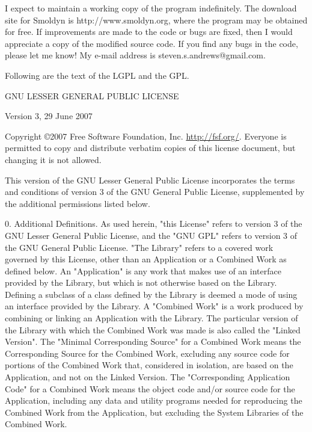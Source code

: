 \documentclass {scrbook}
\begin{document}
I expect to maintain a working copy of the program indefinitely. The download site for Smoldyn is http://www.smoldyn.org, where the program may be obtained for free. If improvements are made to the code or bugs are fixed, then I would appreciate a copy of the modified source code. If you find any bugs in the code, please let me know! My e-mail address is steven.s.andrews@gmail.com.

Following are the text of the LGPL and the GPL.

\begin{tiny}
\begin{center}
GNU LESSER GENERAL PUBLIC LICENSE

Version 3, 29 June 2007
\end{center}

Copyright \copyright 2007 Free Software Foundation, Inc. \url{http://fsf.org/}. Everyone is permitted to copy and distribute verbatim copies of this license document, but changing it is not allowed.

This version of the GNU Lesser General Public License incorporates the terms and conditions of version 3 of the GNU General Public License, supplemented by the additional permissions listed below.

0. Additional Definitions. As used herein, "this License" refers to version 3 of the GNU Lesser General Public License, and the "GNU GPL" refers to version 3 of the GNU General Public License. "The Library" refers to a covered work governed by this License, other than an Application or a Combined Work as defined below. An "Application" is any work that makes use of an interface provided by the Library, but which is not otherwise based on the Library. Defining a subclass of a class defined by the Library is deemed a mode of using an interface provided by the Library. A "Combined Work" is a work produced by combining or linking an Application with the Library. The particular version of the Library with which the Combined Work was made is also called the "Linked Version". The "Minimal Corresponding Source" for a Combined Work means the Corresponding Source for the Combined Work, excluding any source code for portions of the Combined Work that, considered in isolation, are based on the Application, and not on the Linked Version. The "Corresponding Application Code" for a Combined Work means the object code and/or source code for the Application, including any data and utility programs needed for reproducing the Combined Work from the Application, but excluding the System Libraries of the Combined Work.


\end{tiny}
\end{document}
